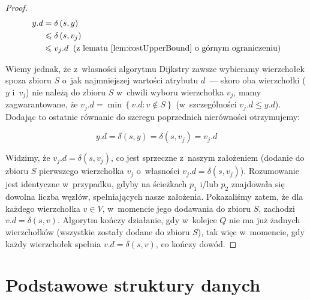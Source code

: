 \begin{proof}
\begin{equation}
\begin{aligned}
y.d &= \delta \left( s, y \right) \\
&\leqslant \delta \left( s, v_{j} \right) \\
&\leqslant v_{j}.d \; \; \textrm{(z lematu \ref{lem:costUpperBound} o~górnym ograniczeniu)}
\end{aligned}
\end{equation}

Wiemy jednak, że z~własności algorytmu Dijkstry zawsze wybieramy wierzchołek spoza zbioru $S$ o~jak najmniejszej wartości atrybutu $d$~--- skoro oba wierzchołki ($y$ i~$v_{j}$) nie należą do zbioru $S$ w~chwili wyboru wierzchołka $v_{j}$, mamy zagwarantowane, że $v_{j}.d = \min \left\{ v.d : v \notin S \right\}$ (w~szczególności $v_{j}.d \leqslant y.d$). Dodając to ostatnie równanie do szeregu poprzednich nierówności otrzymujemy:

\begin{equation}
y.d = \delta \left( s, y \right) = \delta \left( s, v_{j} \right) = v_{j}.d
\end{equation}

Widzimy, że $ v_{j}.d = \delta \left( s, v_{j} \right) $, co jest sprzeczne z~naszym założeniem (dodanie do zbioru $S$ pierwszego wierzchołka $v_{j}$ o~własności  $v_{j}.d = \delta \left( s, v_{j} \right) $). Rozumowanie jest identyczne w~przypadku, gdyby na ścieżkach $p_{1}$ i/lub $p_{2}$ znajdowała się dowolna liczba węzłów, spełniających nasze założenia. Pokazaliśmy zatem, że dla każdego wierzchołka $v \in V$, w~momencie jego dodawania do zbioru $S$, zachodzi $v.d = \delta \left( s, v \right)$. Algorytm kończy działanie, gdy w~kolejce $Q$ nie ma już żadnych wierzchołków (wszystkie zostały dodane do zbioru $S$), tak więc w~momencie, gdy każdy wierzchołek spełnia $v.d = \delta \left( s, v \right)$, co kończy dowód.
\end{proof}

\section{Podstawowe struktury danych}

